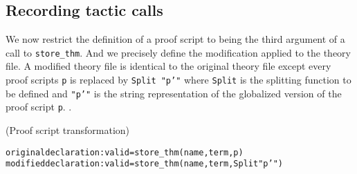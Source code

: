 \documentclass[runningheads,a4paper,draft]{svjour3}
\def\sml{\textsf{SML}\xspace}
\begin{document}
%
%
%
%
%
%
%  
%
%
%
%
%
%
%
%
%
%
%
%


\subsection{Recording tactic calls}

We now restrict the definition of a proof script to being the third 
argument of a call to \texttt{store\_thm}. And we precisely define the 
modification applied to the theory file. A modified theory file is identical to 
the original theory file except every proof scripts \texttt{p} is
replaced by \texttt{Split "p'"} where \texttt{Split} is the splitting function 
to be defined and \texttt{"p'"} is the string representation of the globalized 
version of the proof script 
\texttt{p}. 
.
\begin{example}(Proof script transformation)
\begin{alltt}
original declaration: val id = store_thm (name, term, p)
modified declaration: val id = store_thm (name, term, Split "p'")
\end{alltt}
\end{example}
\end{document}
